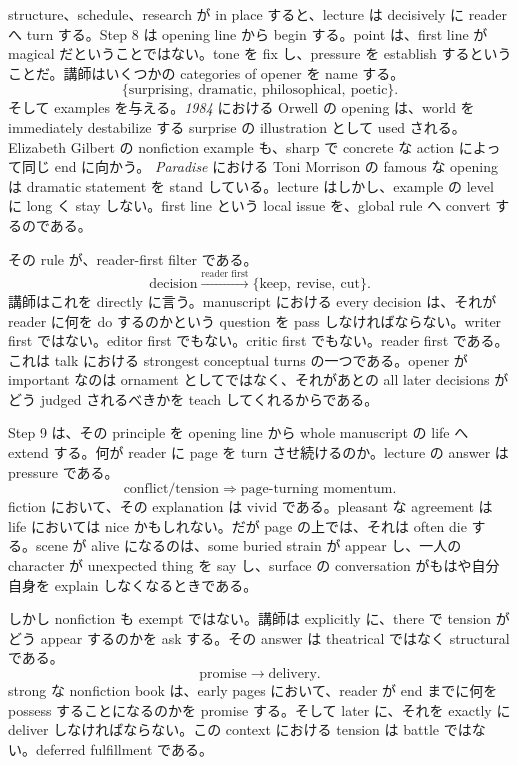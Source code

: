 structure、schedule、research が in place すると、lecture は decisively に reader へ turn する。Step 8 は opening line から begin する。point は、first line が magical だということではない。tone を fix し、pressure を establish するということだ。講師はいくつかの categories of opener を name する。
\begin{equation}
\{\text{surprising},\ \text{dramatic},\ \text{philosophical},\ \text{poetic}\}.
\end{equation}
そして examples を与える。\textit{1984} における Orwell の opening は、world を immediately destabilize する surprise の illustration として used される。Elizabeth Gilbert の nonfiction example も、sharp で concrete な action によって同じ end に向かう。 \textit{Paradise} における Toni Morrison の famous な opening は dramatic statement を stand している。lecture はしかし、example の level に long く stay しない。first line という local issue を、global rule へ convert するのである。

その rule が、reader-first filter である。
\begin{equation}
\text{decision} \xrightarrow{\text{reader first}} \{\text{keep},\ \text{revise},\ \text{cut}\}.
\end{equation}
講師はこれを directly に言う。manuscript における every decision は、それが reader に何を do するのかという question を pass しなければならない。writer first ではない。editor first でもない。critic first でもない。reader first である。これは talk における strongest conceptual turns の一つである。opener が important なのは ornament としてではなく、それがあとの all later decisions がどう judged されるべきかを teach してくれるからである。

Step 9 は、その principle を opening line から whole manuscript の life へ extend する。何が reader に page を turn させ続けるのか。lecture の answer は pressure である。
\begin{equation}
\text{conflict/tension} \Rightarrow \text{page-turning momentum}.
\end{equation}
fiction において、その explanation は vivid である。pleasant な agreement は life においては nice かもしれない。だが page の上では、それは often die する。scene が alive になるのは、some buried strain が appear し、一人の character が unexpected thing を say し、surface の conversation がもはや自分自身を explain しなくなるときである。

しかし nonfiction も exempt ではない。講師は explicitly に、there で tension がどう appear するのかを ask する。その answer は theatrical ではなく structural である。
\begin{equation}
\text{promise} \to \text{delivery}.
\end{equation}
strong な nonfiction book は、early pages において、reader が end までに何を possess することになるのかを promise する。そして later に、それを exactly に deliver しなければならない。この context における tension は battle ではない。deferred fulfillment である。

